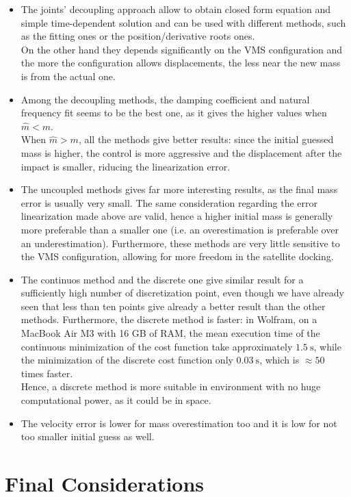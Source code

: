 \documentclass[a4paper,12pt,oneside]{report}
\begin{document}
\begin{itemize}
  \item The joints' decoupling approach allow to obtain closed form equation and simple time-dependent solution and can be used with different methods, such as the fitting ones or the position/derivative roots ones.\\
    On the other hand they depends significantly on the VMS configuration and the more the configuration allows displacements, the less near the new mass is from the actual one.
  \item Among the decoupling methods, the damping coefficient and natural frequency fit seems to be the best one, as it gives the higher values when $\hat{m}<m$.\\
    When $\hat{m}>m$, all the methods give better results: since the initial guessed mass is higher, the control is more aggressive and the displacement after the impact is smaller, riducing the linearization error.
  \item The uncoupled methods gives far more interesting results, as the final mass error is usually very small. The same consideration regarding the error linearization made above are valid, hence a higher initial mass is generally more preferable than a smaller one (i.e. an overestimation is preferable over an underestimation).
    Furthermore, these methods are very little sensitive to the VMS configuration, allowing for more freedom in the satellite docking.
  \item The continuos method and the discrete one give similar result for a sufficiently high number of discretization point, even though we have already seen that less than ten points give already a better result than the other methods. Furthermore, the discrete method is faster: in Wolfram, on a MacBook Air M3 with 16 GB of RAM, the mean execution time of the continuous minimization of the cost function take approximately $\SI{1.5}{\second}$, while the minimization of the discrete cost function only $\SI{0.03}{\second}$, which is $\approx 50$ times faster.\\
    Hence, a discrete method is more suitable in environment with no huge computational power, as it could be in space.
  \item The velocity error is lower for mass overestimation too and it is low for not too smaller initial guess as well.
\end{itemize}
\newpage
\section{Final Considerations}
\end{document}

